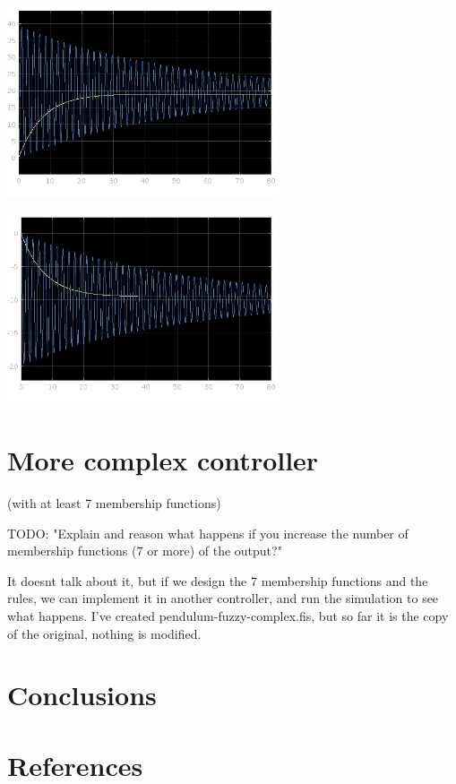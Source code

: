 \documentclass[12pt]{article}
\begin{document}
\includegraphics[width=0.6\textwidth]{simulation1.jpg}\par\vspace{1cm}
\includegraphics[width=0.6\textwidth]{simulation2.jpg}\par\vspace{1cm}

\section{More complex controller}

(with at least 7 membership functions)

TODO: "Explain and reason what happens if you increase the number of membership functions (7 or more) 
of the output?"

It doesnt talk about it, but if we design the 7 membership functions and the rules, we can implement it in another controller, and run the simulation to see what happens.
I've created pendulum-fuzzy-complex.fis, but so far it is the copy of the original, nothing is modified. 


\section{Conclusions}

\section*{References}
\printbibliography[heading=none]
\end{document}
